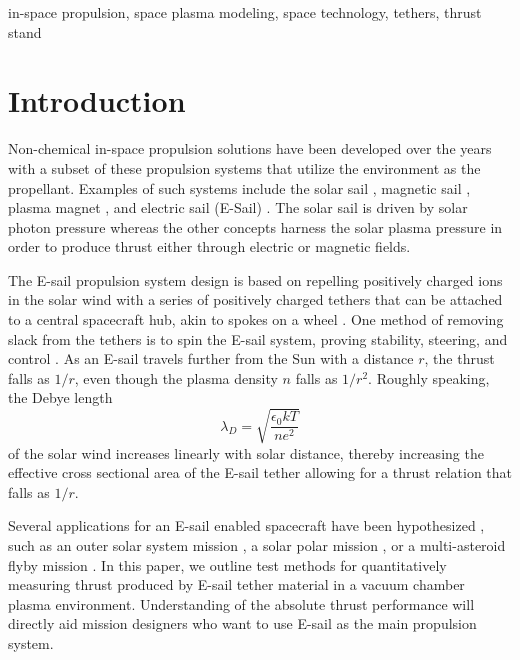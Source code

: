 \documentclass[conference]{IEEEtran}
\begin{document}
\begin{IEEEkeywords}
in-space propulsion, space plasma modeling, space technology, tethers, thrust stand
\end{IEEEkeywords}
\section{Introduction}
Non-chemical in-space propulsion solutions have been developed over the years \cite[e.g.,][]{frisbee2003advanced, millis2018breakthrough} with a subset of these propulsion systems that utilize the environment as the propellant. Examples of such systems include the solar sail \citep{fu2016solar}, magnetic sail \citep{funaki2006experimental}, plasma magnet \citep{slough2005plasma}, and electric sail (E-Sail) \citep{janhunen2004electric}. The solar sail is driven by solar photon pressure whereas the other concepts harness the solar plasma pressure in order to produce thrust either through electric or magnetic fields.

The E-sail propulsion system design is based on repelling positively charged ions in the solar wind with a series of positively charged tethers that can be attached to a central spacecraft hub, akin to spokes on a wheel \citep{janhunen2004electric}. One method of removing slack from the tethers is to spin the E-sail system, proving stability, steering, and control \citep{toivanen2013spin, toivanen2017thrust}. As an E-sail travels further from the Sun with a distance $r$, the thrust falls as $1/r$, even though the plasma density $n$ falls as $1/r^2$. Roughly speaking, the Debye length
\begin{equation}
\lambda_D = \sqrt{\frac{\epsilon_0 kT}{ne^2}}
\end{equation}
of the solar wind increases linearly with solar distance, thereby increasing the effective cross sectional area of the E-sail tether allowing for a thrust relation that falls as $1/r$.

Several applications for an E-sail enabled spacecraft have been hypothesized \citep{janhunen2014overview}, such as an outer solar system mission \citep{quarta2010electric}, a solar polar mission \citep{mengali2009non}, or a multi-asteroid flyby mission \citep{mengali2014optimal}. In this paper, we outline test methods for quantitatively measuring thrust produced by E-sail tether material in a vacuum chamber plasma environment. Understanding of the absolute thrust performance will directly aid mission designers who want to use E-sail as the main propulsion system.
\end{document}
